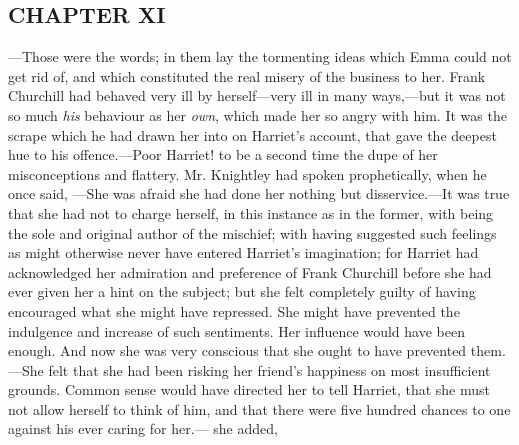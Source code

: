 \subsection[chapter-xi-2]{\useURL[url49][][][]\from[url49]CHAPTER XI}

---Those were the words; in them lay the tormenting ideas which Emma could not get rid of, and which constituted the real misery of the business to her. Frank Churchill had behaved very ill by herself---very ill in many ways,---but it was not so much {\em his} behaviour as her {\em own}, which made her so angry with him. It was the scrape which he had drawn her into on Harriet's account, that gave the deepest hue to his offence.---Poor Harriet! to be a second time the dupe of her misconceptions and flattery. Mr. Knightley had spoken prophetically, when he once said, ---She was afraid she had done her nothing but disservice.---It was true that she had not to charge herself, in this instance as in the former, with being the sole and original author of the mischief; with having suggested such feelings as might otherwise never have entered Harriet's imagination; for Harriet had acknowledged her admiration and preference of Frank Churchill before she had ever given her a hint on the subject; but she felt completely guilty of having encouraged what she might have repressed. She might have prevented the indulgence and increase of such sentiments. Her influence would have been enough. And now she was very conscious that she ought to have prevented them.---She felt that she had been risking her friend's happiness on most insufficient grounds. Common sense would have directed her to tell Harriet, that she must not allow herself to think of him, and that there were five hundred chances to one against his ever caring for her.--- she added, 

